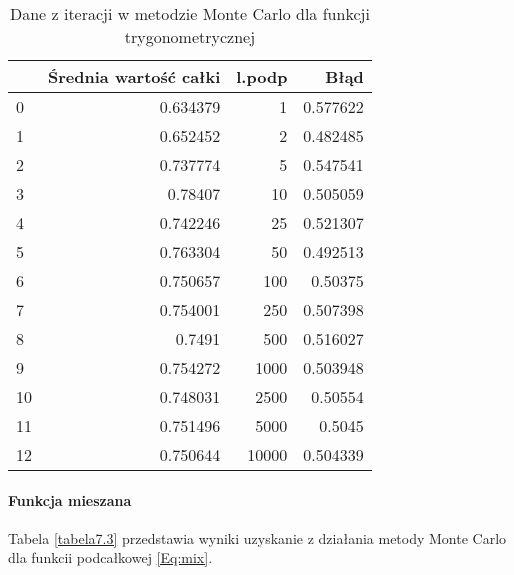 \documentclass[12pt,twoside]{article}
\begin{document}
\begin{table}[H]
\centering 
\caption{Dane z iteracji w metodzie Monte Carlo dla funkcji trygonometrycznej}
\label{tabela7.2}
\begin{tabular}{lrrr}
\toprule
{} &  Średnia wartość całki &  l.podp &      Błąd \\
\midrule
0  &               0.634379 &       1 &  0.577622 \\
1  &               0.652452 &       2 &  0.482485 \\
2  &               0.737774 &       5 &  0.547541 \\
3  &                0.78407 &      10 &  0.505059 \\
4  &               0.742246 &      25 &  0.521307 \\
5  &               0.763304 &      50 &  0.492513 \\
6  &               0.750657 &     100 &  0.50375 \\
7  &               0.754001 &     250 &  0.507398 \\
8  &                 0.7491 &     500 &  0.516027 \\
9  &               0.754272 &    1000 &  0.503948 \\
10 &               0.748031 &    2500 &  0.50554 \\
11 &               0.751496 &    5000 &  0.5045 \\
12 &               0.750644 &   10000 &  0.504339 \\
\bottomrule
\end{tabular}
\end{table}

\paragraph{Funkcja mieszana}

Tabela \eqref{tabela7.3} przedstawia wyniki uzyskanie z działania metody Monte Carlo dla funkcii podcałkowej \eqref{Eq:mix}.
\end{document}
